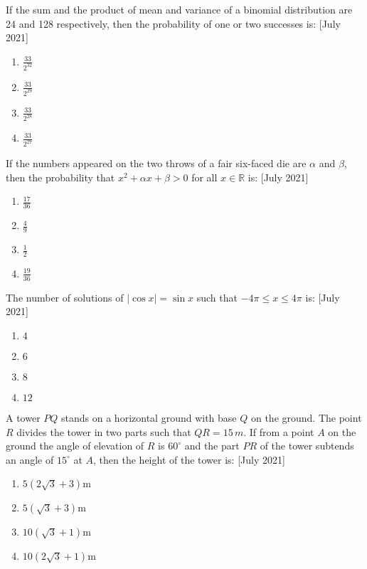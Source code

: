 \iffalse
\title{July 2021}
\author{AI24BTECH11012}
\section{mcq-single}
\fi
    \item If the sum and the product of mean and variance of a binomial distribution are 24 and 128 respectively, then the probability of one or two successes is:
    \hfill{[July 2021]}
    \begin{enumerate}
        \item $\frac{33}{2^{32}}$
        \item $\frac{33}{2^{29}}$
        \item $\frac{33}{2^{28}}$
        \item $\frac{33}{2^{27}}$
    \end{enumerate}
    
    \item If the numbers appeared on the two throws of a fair six-faced die are $\alpha$ and $\beta$, then the probability that $x^2 + \alpha x + \beta > 0$ for all $x \in \mathbb{R}$ is:
    \hfill{[July 2021]}
    \begin{enumerate}
        \item $\frac{17}{36}$
        \item $\frac{4}{9}$
        \item $\frac{1}{2}$
        \item $\frac{19}{36}$
    \end{enumerate}

    \item The number of solutions of $|\cos x| = \sin x$ such that $-4\pi \leq x \leq 4\pi$ is:
    \hfill{[July 2021]}
    \begin{enumerate}
        \item $4$
        \item $6$
        \item $8$
        \item $12$
    \end{enumerate}

    \item A tower $PQ$ stands on a horizontal ground with base $Q$ on the ground. The point $R$ divides the tower in two parts such that $QR = 15 \, m$. If from a point $A$ on the ground the angle of elevation of $R$ is $60^\circ$ and the part $PR$ of the tower subtends an angle of $15^\circ$ at $A$, then the height of the tower is:
    \hfill{[July 2021]}
    \begin{enumerate}
        \item $5(2\sqrt{3} + 3)$m
        \item $5(\sqrt{3} + 3)$m
        \item $10(\sqrt{3} + 1)$m
        \item $10(2\sqrt{3} + 1)$m
    \end{enumerate}

